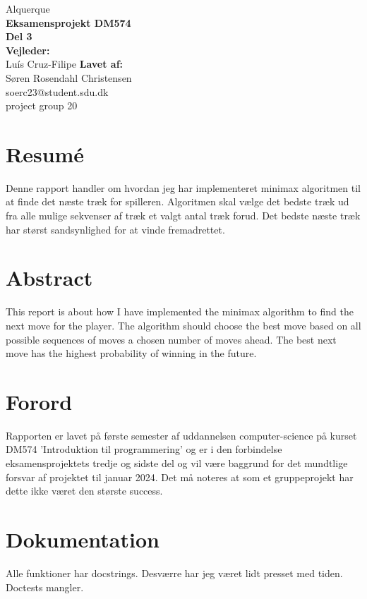 \documentclass{article}
\begin{document}
\begin{titlepage}
    \vfill
    \clearpage\thispagestyle{empty}
    \centering
    {\Large Alquerque}\vspace{0.5cm}\\
    {\bfseries Eksamensprojekt DM574\\
    Del 3}\\
    \vfill
    {\bfseries Vejleder:}\\
    {Luís Cruz-Filipe}
    \vfill
    {\bfseries Lavet af:}\\
    {Søren Rosendahl Christensen\\
    soerc23@student.sdu.dk\\
    project group 20}
    \vskip6cm
\end{titlepage}

\section*{Resumé}
Denne rapport handler om hvordan jeg har implementeret minimax algoritmen til at finde det
næste træk for spilleren. Algoritmen skal vælge det bedste træk ud fra alle mulige 
sekvenser af træk et valgt antal træk forud. Det bedste næste træk 
har størst sandsynlighed for at vinde fremadrettet.

\section*{Abstract}
This report is about how I have implemented the minimax algorithm to find the 
next move for the player. The algorithm should choose the best move based on all possible 
sequences of moves a chosen number of moves ahead. The best next move 
has the highest probability of winning in the future.

\newpage
\section*{Forord}
Rapporten er lavet på første semester af uddannelsen computer-science på kurset DM574
'Introduktion til programmering' og er i den forbindelse eksamensprojektets 
tredje og sidste del og vil være baggrund for det mundtlige forsvar af projektet til januar 2024.
\bigbreak
Det må noteres at som et gruppeprojekt har dette ikke været den største success.
\clearpage
\tableofcontents

\newpage


\newpage


\section{Dokumentation}
Alle funktioner har docstrings. Desværre har jeg været lidt presset med tiden. Doctests mangler.

\newpage


\newpage

\end{document}

